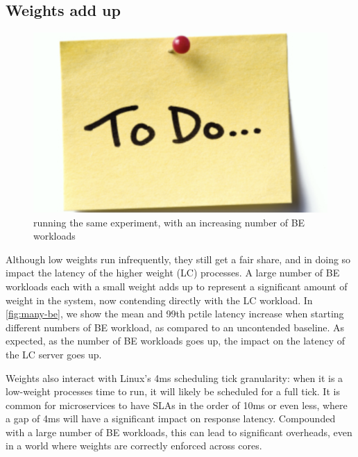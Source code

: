 \subsection{Weights add up}


\begin{figure}[t]
    \centering
    \includegraphics[width=0.8\columnwidth]{graphs/todo.png}
    \caption{running the same experiment, with an increasing number of BE
    workloads}\label{fig:many-be}
\end{figure}


Although low weights run infrequently, they still get a fair share, and in doing
so impact the latency of the higher weight (LC) processes. A large number of BE
workloads each with a small weight adds up to represent a significant amount of
weight in the system, now contending directly with the LC workload. In
\autoref{fig:many-be}, we show the mean and 99th pctile latency increase when
starting different numbers of BE workload, as compared to an uncontended
baseline. As expected, as the number of BE workloads goes up, the impact on the
latency of the LC server goes up.

Weights also interact with Linux's 4ms scheduling tick granularity: when it is a
low-weight processes time to run, it will likely be scheduled for a full tick.
It is common for microservices to have SLAs in the order of 10ms or even less,
where a gap of 4ms will have a significant impact on response latency.
Compounded with a large number of BE workloads, this can lead to significant
overheads, even in a world where weights are correctly enforced across cores.




